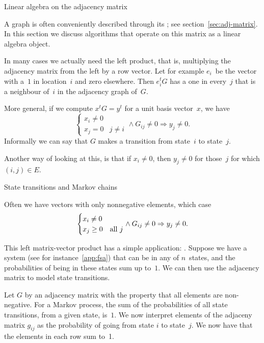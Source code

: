 
 {Linear algebra on the adjacency matrix}

A graph is often conveniently described through its
; see section~\ref{sec:adj-matrix}.
In this section we discuss algorithms that operate on this
matrix as a linear algebra object.

In many cases we actually need the left product, that is, multiplying
the adjacency matrix from the left by a row vector. Let for example $e_i$~be 
the vector with a~$1$ in location~$i$ and zero elsewhere. Then $e_i^tG$
has a one in every~$j$ that is a neighbour of~$i$ in the adjacency graph of~$G$.

More general, if we compute $x^tG=y^t$ for a unit basis vector~$x$, we have
\[ 
\begin{cases} x_i\not=0 \\ x_j=0&j\not= i \end{cases}
\wedge G_{ij}\not=0 \Rightarrow y_j\not=0.
\]
Informally we can say that $G$ makes a transition from state~$i$ to state~$j$.

Another way of looking at this, is that
if $x_i\not=0$, then $y_j\not=0$ for those~$j$
for which $(i,j)\in E$.

 {State transitions and Markov chains}
\label{sec:markov-matrix}

Often we have vectors with only nonnegative elements, which case
\[ 
\begin{cases} x_i\not=0 \\ x_j\geq 0&\hbox{all $j$} \end{cases}
\wedge G_{ij}\not=0 \Rightarrow y_j\not=0.
\]

This left matrix-vector product has a simple application: .
Suppose we have a system (see for instance~\ref{app:fsa}) that can be
in any of $n$~states, and the probabilities of being in these states sum up to~$1$.
We can then use the adjacency matrix to model
state transitions.

Let $G$ by an adjacency matrix with the property that all elements are
non-negative.
For a Markov process,
the sum of the probabilities of all state transitions,
from a given state, is~$1$.
We now interpret elements of the adjaceny matrix
$g_{ij}$ as the probability of going from state $i$ to state~$j$.
We now have that the elements in each row sum to~1.

